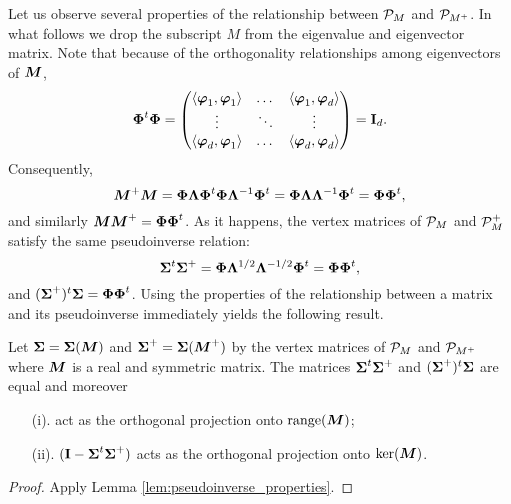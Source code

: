 Let us observe several properties of the relationship between $\P_M$ and $\P_{M^+}$. In what follows we drop the subscript $M$ from the eigenvalue and eigenvector matrix. Note that because of the orthogonality relationships among eigenvectors of $\M$, 
\[\Eig^\tp \Eig = \begin{pmatrix}
\la \vp_1,\vp_1\ra & \dots & \la \vp_1,\vp_d \ra \\
\vdots & \ddots & \vdots \\
\la \vp_d,\vp_1\ra & \dots & \la \vp_d,\vp_d\ra
\end{pmatrix} = \I_d.\]
Consequently, 
\begin{equation*}
\M^+\M = \Eig\Eval\Eig^\tp \Eig\Eval^{-1}\Eig^\tp = \Eig\Eval\Eval^{-1}\Eig^\tp = \Eig\Eig^\tp,
\end{equation*}
and similarly $\M\M^+= \Eig\Eig^\tp$. As it happens, the vertex matrices of $\P_M$ and $\P_M^+$ satisfy the same pseudoinverse relation: 
\begin{equation*}
\Sv^\tp\Sv^+ = \Eig \Eval^{1/2}\Eval^{-1/2}\Eig^\tp = \Eig\Eig^\tp, 
\end{equation*}
and $(\Sv^+)^\tp\Sv = \Eig\Eig^\tp$. Using the properties of the relationship between a matrix and its pseudoinverse immediately yields the following result. 

\begin{lemma}
	Let $\Sv=\Sv(\M)$ and $\Sv^+=\Sv(\M^+)$ by the vertex matrices of $\P_M$ and $\P_{M^+}$ where $\M$ is a real and symmetric matrix. The matrices $\Sv^\tp\Sv^+$ and $(\Sv^+)^\tp\Sv$ are equal and moreover 
	\begin{enumerate}
		\item[(i).] act as the orthogonal projection onto $\range(\M)$;
		\item[(ii).] $(\I-\Sv^\tp\Sv^+)$ acts as the orthogonal projection onto $\ker(\M)$. 
	\end{enumerate}
\end{lemma}
\begin{proof}
	Apply Lemma \ref{lem:pseudoinverse_properties}. 
\end{proof}

